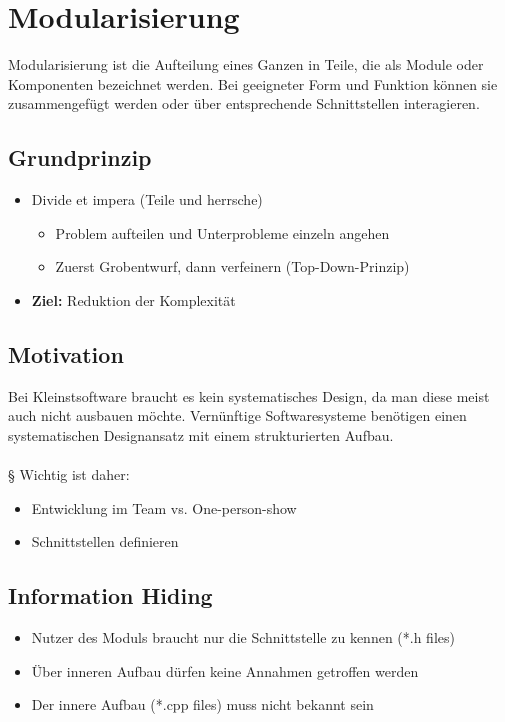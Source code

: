 \section{Modularisierung}
Modularisierung ist die Aufteilung eines Ganzen in Teile, die als Module oder Komponenten bezeichnet werden. Bei geeigneter Form und Funktion können sie zusammengefügt werden oder über entsprechende Schnittstellen interagieren.

\subsection{Grundprinzip}
\begin{itemize}
  \item Divide et impera (Teile und herrsche)
  \begin{itemize}
    \item Problem aufteilen und Unterprobleme einzeln angehen
    \item Zuerst Grobentwurf, dann verfeinern (Top-Down-Prinzip)
  \end{itemize}
  \item \textbf{Ziel:} Reduktion der Komplexität
\end{itemize}

\subsection{Motivation}
Bei Kleinstsoftware braucht es kein systematisches Design, da man diese meist auch nicht ausbauen möchte. Vernünftige Softwaresysteme benötigen einen systematischen Designansatz mit einem strukturierten Aufbau.\\\\§
Wichtig ist daher:
	\begin{itemize}
	\item Entwicklung im Team vs. One-person-show
  	\item Schnittstellen definieren
	\end{itemize}

\subsection{Information Hiding}
\begin{itemize}
  \item Nutzer des Moduls braucht nur die Schnittstelle zu kennen (*.h files)
  \item Über inneren Aufbau dürfen keine Annahmen getroffen werden
  \item Der innere Aufbau (*.cpp files) muss nicht bekannt sein
\end{itemize}

